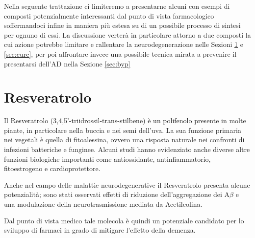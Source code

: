 \documentclass[a4paper, 12pt]{article}
\begin{document}
Nella seguente trattazione ci limiteremo a presentarne alcuni con esempi di composti potenzialmente interessanti dal punto di vista farmacologico soffermandoci infine in maniera più estesa su di un possibile processo di sintesi per ognuno di essi.
La discussione verterà in particolare attorno a due composti la cui azione potrebbe limitare e rallentare la neurodegenerazione nelle Sezioni \ref{sec:resv} e \ref{sec:curc}, per poi affrontare invece una possibile tecnica mirata a prevenire il presentarsi dell'AD nella Sezione \ref{sec:byp}

\section{Resveratrolo}
\label{sec:resv}
Il Resveratrolo (3,4,5'-triidrossil-trans-stilbene) è un polifenolo presente in molte piante, in particolare nella buccia e nei semi dell'uva. La sua funzione primaria nei vegetali è quella di fitoalessina, ovvero una risposta naturale nei confronti di infezioni batteriche e funginee. Alcuni studi hanno evidenziato anche diverse altre funzioni biologiche importanti come antiossidante, antinfiammatorio, fitoestrogeno e cardioprotettore.

Anche nel campo delle malattie neurodegenerative il Resveratrolo presenta alcune potenzialità; sono stati osservati effetti di riduzione dell'aggregazione dei A$\beta$ e una modulazione della neurotrasmissione mediata da Acetilcolina.

Dal punto di vista medico tale molecola è quindi un potenziale candidato per lo sviluppo di farmaci in grado di mitigare l'effetto della demenza. \cite{jabir_cholinesterase_2018}
\end{document}
